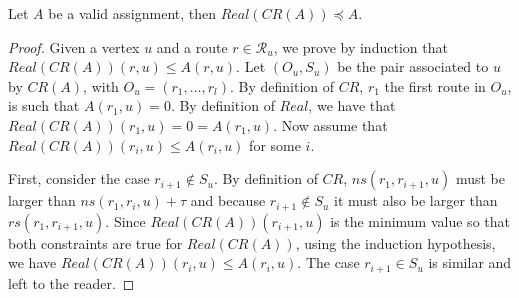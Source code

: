 \documentclass[english]{article}
\begin{document}
\begin{lemma}\label{lemma:prec}
Let $A$ be a valid assignment, then $Real(CR(A)) \preceq A$.
\end{lemma}
\begin{proof}
Given a vertex $u$ and a route $r \in \mathcal{R}_u$, we prove by induction that $Real(CR(A))(r,u) \leq A(r,u)$.
Let $(O_u,S_u)$ be the pair associated to $u$ by $CR(A)$, with $O_u = (r_1,\dots,r_l)$. By definition of $CR$, $r_1$ the first route in $O_u$, is such that $A(r_1,u) = 0$. By definition of $Real$, we have that  $Real(CR(A))(r_1,u) = 0 = A(r_1,u)$.
Now assume that $Real(CR(A))(r_i,u) \leq A(r_i,u)$ for some $i$. 

First, consider the case $r_{i+1} \notin S_u$. By definition of $CR$, $ns(r_1,r_{i+1},u)$ must be larger than 
$ns(r_1,r_{i},u)+ \tau$ and because $r_{i+1} \notin S_u$ it must also be larger than $rs(r_1,r_{i+1},u)$. 
Since $Real(CR(A))(r_{i+1},u)$ is the minimum value so that both constraints are true for $Real(CR(A))$, using
the induction hypothesis, we have $Real(CR(A))(r_i,u) \leq A(r_i,u)$. The case $r_{i+1} \in S_u$ is similar
and left to the reader.
\end{proof}


% 
% 
% 
% 
% 
\end{document}
